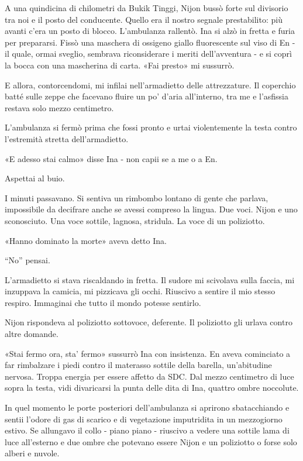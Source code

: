 A una quindicina di chilometri da Bukik Tinggi, Nijon bussò forte sul
divisorio tra noi e il posto del conducente. Quello era il nostro
segnale prestabilito: più avanti c'era un posto di blocco. L'ambulanza
rallentò. Ina si alzò in fretta e furia per prepararsi. Fissò una
maschera di ossigeno giallo fluorescente sul viso di En - il quale,
ormai sveglio, sembrava riconsiderare i meriti dell'avventura - e si
coprì la bocca con una mascherina di carta. «Fai presto» mi sussurrò.

E allora, contorcendomi, mi infilai nell'armadietto delle attrezzature.
Il coperchio batté sulle zeppe che facevano fluire un po' d'aria
all'interno, tra me e l'asfissia restava solo mezzo centimetro.

L'ambulanza si fermò prima che fossi pronto e urtai violentemente la
testa contro l'estremità stretta dell'armadietto.

«E adesso stai calmo» disse Ina - non capii se a me o a En.

Aspettai al buio.

I minuti passavano. Si sentiva un rimbombo lontano di gente che parlava,
impossibile da decifrare anche se avessi compreso la lingua. Due voci.
Nijon e uno sconosciuto. Una voce sottile, lagnosa, stridula. La voce di
un poliziotto.

«Hanno dominato la morte» aveva detto Ina.

``No'' pensai.

L'armadietto si stava riscaldando in fretta. Il sudore mi scivolava
sulla faccia, mi inzuppava la camicia, mi pizzicava gli occhi. Riuscivo
a sentire il mio stesso respiro. Immaginai che tutto il mondo potesse
sentirlo.

Nijon rispondeva al poliziotto sottovoce, deferente. Il poliziotto gli
urlava contro altre domande.

«Stai fermo ora, sta' fermo» sussurrò Ina con insistenza. En aveva
cominciato a far rimbalzare i piedi contro il materasso sottile della
barella, un'abitudine nervosa. Troppa energia per essere affetto da SDC.
Dal mezzo centimetro di luce sopra la testa, vidi divaricarsi la punta
delle dita di Ina, quattro ombre noccolute.

In quel momento le porte posteriori dell'ambulanza si aprirono
sbatacchiando e sentii l'odore di gas di scarico e di vegetazione
imputridita in un mezzogiorno estivo. Se allungavo il collo - piano
piano - riuscivo a vedere una sottile lama di luce all'esterno e due
ombre che potevano essere Nijon e un poliziotto o forse solo alberi e
nuvole.

